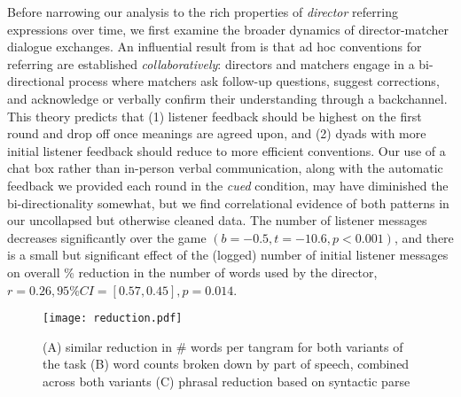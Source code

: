 Before narrowing our analysis to the rich properties of \emph{director} referring expressions over time, we first examine the broader dynamics of director-matcher dialogue exchanges. 
An influential result from \cite[see also \cite{KraussWeinheimer66_Tangrams, GarrodFayLeeOberlanderMacLeod07_GraphicalSymbolSystems}]{ClarkWilkesGibbs86_ReferringCollaborative} is that ad hoc conventions for referring are established \emph{collaboratively}: 
directors and matchers engage in a bi-directional process where matchers ask follow-up questions, suggest corrections, and acknowledge or verbally confirm their understanding through a backchannel. 
This theory predicts that (1) listener feedback should be highest on the first round and drop off once meanings are agreed upon, and (2) dyads with more initial listener feedback should reduce to more efficient conventions. 
Our use of a chat box rather than in-person verbal communication, along with the automatic feedback we provided each round in the \emph{cued} condition, may have diminished the bi-directionality somewhat, but we find correlational evidence of both patterns in our uncollapsed but otherwise cleaned data. 
The number of listener messages decreases significantly over the game $(b=-0.5, t = -10.6, p < 0.001)$, and there is a small but significant effect of the (logged) number of initial listener messages on overall \% reduction in the number of words used by the director, $r = 0.26, 95\% CI = [0.57, 0.45], p = 0.014$.

\begin{figure}[t]
\texttt{[image: reduction.pdf]}
\caption{(A) similar reduction in \# words per tangram for both variants of the task (B) word counts broken down by part of speech, combined across both variants (C) phrasal reduction based on syntactic parse }
\label{fig:reduction}
\end{figure}

